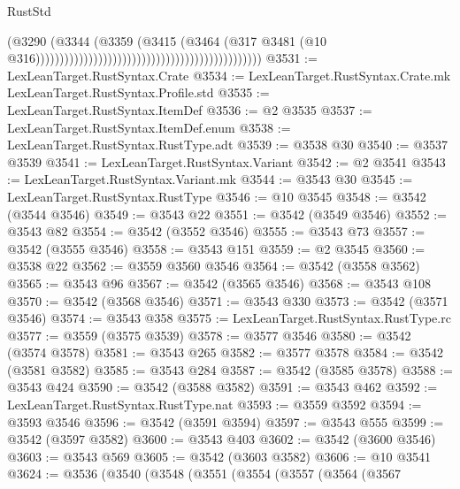 \begin{lexlean}{RustStd}
\begin{coremodule}
                                                                                    (@3290
                                                                                      (@3344
                                                                                        (@3359
                                                                                          (@3415
                                                                                            (@3464
                                                                                              (@317
                                                                                                @3481
                                                                                                (@10
                                                                                                  @316)))))))))))))))))))))))))))))))))))))))))))))))
@3531 := LexLeanTarget.RustSyntax.Crate
@3534 := LexLeanTarget.RustSyntax.Crate.mk LexLeanTarget.RustSyntax.Profile.std
@3535 := LexLeanTarget.RustSyntax.ItemDef
@3536 := @2 @3535
@3537 := LexLeanTarget.RustSyntax.ItemDef.enum
@3538 := LexLeanTarget.RustSyntax.RustType.adt
@3539 := @3538 @30
@3540 := @3537 @3539
@3541 := LexLeanTarget.RustSyntax.Variant
@3542 := @2 @3541
@3543 := LexLeanTarget.RustSyntax.Variant.mk
@3544 := @3543 @30
@3545 := LexLeanTarget.RustSyntax.RustType
@3546 := @10 @3545
@3548 := @3542 (@3544 @3546)
@3549 := @3543 @22
@3551 := @3542 (@3549 @3546)
@3552 := @3543 @82
@3554 := @3542 (@3552 @3546)
@3555 := @3543 @73
@3557 := @3542 (@3555 @3546)
@3558 := @3543 @151
@3559 := @2 @3545
@3560 := @3538 @22
@3562 := @3559 @3560 @3546
@3564 := @3542 (@3558 @3562)
@3565 := @3543 @96
@3567 := @3542 (@3565 @3546)
@3568 := @3543 @108
@3570 := @3542 (@3568 @3546)
@3571 := @3543 @330
@3573 := @3542 (@3571 @3546)
@3574 := @3543 @358
@3575 := LexLeanTarget.RustSyntax.RustType.rc
@3577 := @3559 (@3575 @3539)
@3578 := @3577 @3546
@3580 := @3542 (@3574 @3578)
@3581 := @3543 @265
@3582 := @3577 @3578
@3584 := @3542 (@3581 @3582)
@3585 := @3543 @284
@3587 := @3542 (@3585 @3578)
@3588 := @3543 @424
@3590 := @3542 (@3588 @3582)
@3591 := @3543 @462
@3592 := LexLeanTarget.RustSyntax.RustType.nat
@3593 := @3559 @3592
@3594 := @3593 @3546
@3596 := @3542 (@3591 @3594)
@3597 := @3543 @555
@3599 := @3542 (@3597 @3582)
@3600 := @3543 @403
@3602 := @3542 (@3600 @3546)
@3603 := @3543 @569
@3605 := @3542 (@3603 @3582)
@3606 := @10 @3541
@3624 := @3536
    (@3540
      (@3548
        (@3551
          (@3554
            (@3557
              (@3564
                (@3567

\end{coremodule}
\end{lexlean}
